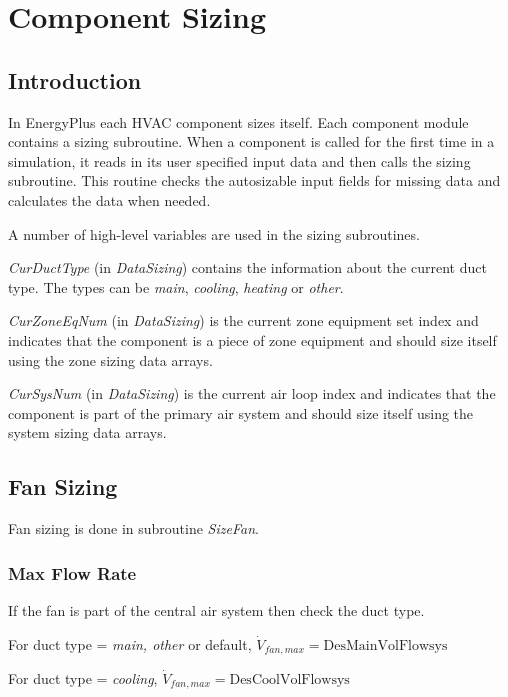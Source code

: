 \section{Component Sizing}\label{component-sizing}

\subsection{Introduction}\label{introduction}

In EnergyPlus each HVAC component sizes itself. Each component module contains a sizing subroutine. When a component is called for the first time in a simulation, it reads in its user specified input data and then calls the sizing subroutine. This routine checks the autosizable input fields for missing data and calculates the data when needed.

A number of high-level variables are used in the sizing subroutines.

\emph{CurDuctType} (in \emph{DataSizing}) contains the information about the current duct type. The types can be \emph{main}, \emph{cooling}, \emph{heating} or \emph{other}.

\emph{CurZoneEqNum} (in \emph{DataSizing}) is the current zone equipment set index and indicates that the component is a piece of zone equipment and should size itself using the zone sizing data arrays.

\emph{CurSysNum} (in \emph{DataSizing}) is the current air loop index and indicates that the component is part of the primary air system and should size itself using the system sizing data arrays.

\subsection{Fan Sizing}\label{fan-sizing}

Fan sizing is done in subroutine \emph{SizeFan}.

\subsubsection{Max Flow Rate}\label{max-flow-rate}

If the fan is part of the central air system then check the duct type.

For duct type = \emph{main, other} or default, \(\dot{V}_{fan,max} = \text{DesMainVolFlowsys}\)

For duct type = \emph{cooling}, \(\dot{V}_{fan,max} = \text{DesCoolVolFlowsys}\)

